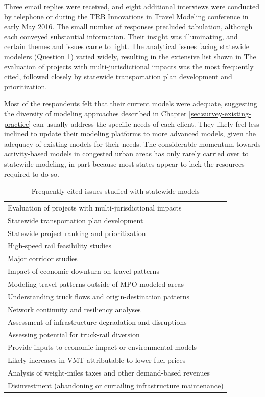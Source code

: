 Three email replies were received, and eight additional interviews were conducted by telephone or during the TRB Innovations in Travel Modeling conference in early May 2016. The small number of responses precluded tabulation, although each conveyed substantial information. Their insight was illuminating, and certain themes and issues came to light. The analytical issues facing statewide modelers (Question 1) varied widely, resulting in the extensive list shown in The evaluation of projects with multi-jurisdictional impacts was the most frequently cited, followed closely by statewide transportation plan development and prioritization.

Most of the respondents felt that their current models were adequate, suggesting the diversity of modeling approaches described in Chapter \ref{sec:survey-existing-practice} can usually address the specific needs of each client. They likely feel less inclined to update their modeling platforms to more advanced models, given the adequacy of existing models for their needs. The considerable momentum towards activity-based models in congested urban areas has only rarely carried over to statewide modeling, in part because most states appear to lack the resources required to do so.

\begin{table}  %
\centering
\caption{Frequently cited issues studied with statewide models}
\label{tab:frequent-issues}
\begin{tabular}{|l|}
\hline
Evaluation of projects with multi-jurisdictional impacts \\
Statewide transportation plan development \\
Statewide project ranking and prioritization \\
High-speed rail feasibility studies \\
Major corridor studies \\
Impact of economic downturn on travel patterns \\
Modeling travel patterns outside of MPO modeled areas \\
Understanding truck flows and origin-destination patterns \\
Network continuity and resiliency analyses \\
Assessment of infrastructure degradation and disruptions \\
Assessing potential for truck-rail diversion \\
Provide inputs to economic impact or environmental models \\
Likely increases in VMT attributable to lower fuel prices \\
Analysis of weight-miles taxes and other demand-based revenues \\
Disinvestment (abandoning or curtailing infrastructure maintenance) \\
\hline
\end{tabular}
\end{table}

